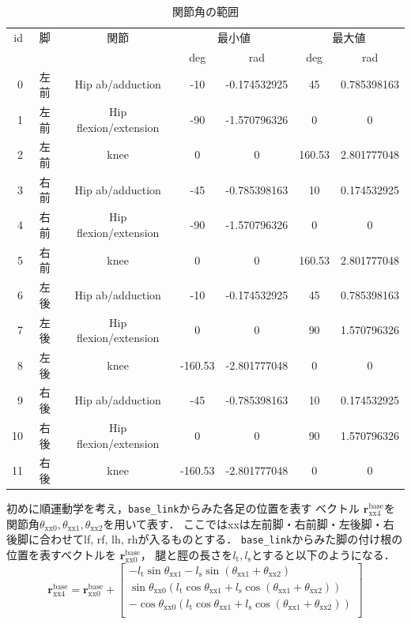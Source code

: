 \documentclass[a4paper]{jlreq}
\begin{document}
  \begin{table}[htb]
    \caption{関節角の範囲}
    \label{table:range_joint_angle}
    \centering
    \begin{tabular}{rcccccc}
      \hline
      id & 脚 & 関節 & \multicolumn{2}{c}{最小値} & \multicolumn{2}{c}{最大値} \\
       &  &  & deg & rad & deg & rad \\
      \hline
      0 & 左前 & Hip ab/adduction & -10 & -0.174532925 & 45 & 0.785398163 \\
      1 & 左前 & Hip flexion/extension & -90 & -1.570796326 & 0 & 0 \\
      2 & 左前 & knee & 0 & 0 & 160.53 & 2.801777048 \\
      3 & 右前 & Hip ab/adduction & -45 & -0.785398163 & 10 & 0.174532925 \\
      4 & 右前 & Hip flexion/extension & -90 & -1.570796326 & 0 & 0 \\
      5 & 右前 & knee & 0 & 0 & 160.53 & 2.801777048 \\
      6 & 左後 & Hip ab/adduction & -10 & -0.174532925 & 45 & 0.785398163 \\
      7 & 左後 & Hip flexion/extension & 0 & 0 & 90 & 1.570796326 \\
      8 & 左後 & knee & -160.53 & -2.801777048 & 0 & 0 \\
      9 & 右後 & Hip ab/adduction & -45 & -0.785398163 & 10 & 0.174532925 \\
      10 & 右後 & Hip flexion/extension & 0 & 0 & 90 & 1.570796326 \\
      11 & 右後 & knee & -160.53 & -2.801777048 & 0 & 0 \\
      \hline
    \end{tabular}
  \end{table}

  初めに順運動学を考え，\texttt{base\_link}からみた各足の位置を表す
  ベクトル  $\boldsymbol{r}_\mathrm{xx4}^\mathrm{base}$を
  関節角$\theta_\mathrm{xx0}, \theta_\mathrm{xx1}, \theta_\mathrm{xx2}$を用いて表す．
  ここではxxは左前脚・右前脚・左後脚・右後脚に合わせてlf, rf, lh, rhが入るものとする．
  \texttt{base\_link}からみた脚の付け根の位置を表すベクトルを
  $\boldsymbol{r}^\mathrm{base}_\mathrm{xx0}$，
  腿と脛の長さを$l_\mathrm{t}, l_\mathrm{s}$とすると以下のようになる．
  \[
    \boldsymbol{r}_\mathrm{xx4}^\mathrm{base} = \boldsymbol{r}^\mathrm{base}_\mathrm{xx0} + \begin{bmatrix}
      -l_\mathrm{t}\sin{\theta_\mathrm{xx1}} - l_\mathrm{s}\sin{\left(\theta_\mathrm{xx1}+\theta_\mathrm{xx2}\right)} \\
      \sin\theta_\mathrm{xx0}\left(l_\mathrm{t}\cos{\theta_\mathrm{xx1}} + l_\mathrm{s}\cos{\left(\theta_\mathrm{xx1}+\theta_\mathrm{xx2}\right)}\right) \\
      -\cos\theta_\mathrm{xx0}\left(l_\mathrm{t}\cos{\theta_\mathrm{xx1}} + l_\mathrm{s}\cos{\left(\theta_\mathrm{xx1}+\theta_\mathrm{xx2}\right)}\right) \\
    \end{bmatrix}
  \]
\end{document}
